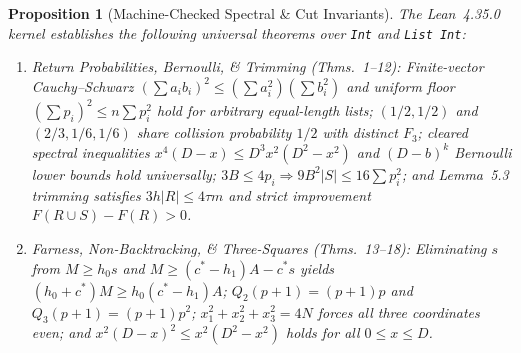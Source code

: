 \documentclass[10pt,twocolumn]{article}
\newtheorem{proposition}{Proposition}
\begin{document}
\begin{proposition}[Machine-Checked Spectral \& Cut Invariants]\label{prop:lean}
The Lean~4.35.0 kernel establishes the following universal theorems over \texttt{Int} and \texttt{List Int}:
\begin{enumerate}[leftmargin=*,nosep]
  \item \emph{Return Probabilities, Bernoulli, \& Trimming (Thms.~1--12):} Finite-vector Cauchy--Schwarz $(\sum a_i b_i)^2 \le (\sum a_i^2)(\sum b_i^2)$ and uniform floor $(\sum p_i)^2 \le n \sum p_i^2$ hold for arbitrary equal-length lists; $(1/2,1/2)$ and $(2/3,1/6,1/6)$ share collision probability $1/2$ with distinct $F_3$; cleared spectral inequalities $x^4(D-x) \le D^3 x^2(D^2-x^2)$ and $(D-b)^k$ Bernoulli lower bounds hold universally; $3B \le 4p_i \Rightarrow 9B^2|S| \le 16\sum p_i^2$; and Lemma~5.3 trimming satisfies $3h|R| \le 4\tau m$ and strict improvement $F(R\cup S) - F(R) > 0$.
  \item \emph{Farness, Non-Backtracking, \& Three-Squares (Thms.~13--18):} Eliminating $s$ from $M \ge h_0 s$ and $M \ge (c^*-h_1)A - c^* s$ yields $(h_0+c^*)M \ge h_0(c^*-h_1)A$; $Q_2(p+1) = (p+1)p$ and $Q_3(p+1) = (p+1)p^2$; $x_1^2+x_2^2+x_3^2 = 4N$ forces all three coordinates even; and $x^2(D-x)^2 \le x^2(D^2-x^2)$ holds for all $0 \le x \le D$.
\end{enumerate}
\end{proposition}
\end{document}
